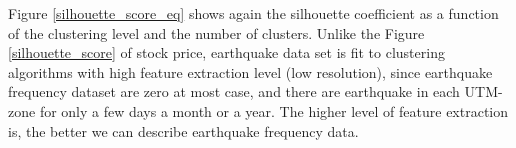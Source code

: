 \documentclass{article}
\begin{document}
Figure \ref{silhouette_score_eq} shows again the silhouette coefficient as a function of the clustering level and the number of clusters. Unlike the Figure \ref{silhouette_score} of stock price, earthquake data set is fit to clustering algorithms with high feature extraction level (low resolution), since earthquake frequency dataset are zero at most case, and there are earthquake in each UTM-zone for only a few days a month or a year. The higher level of feature extraction is, the better we can describe earthquake frequency data.

\begin{figure}[H]
\centering
{}

\end{figure}
\end{document}
